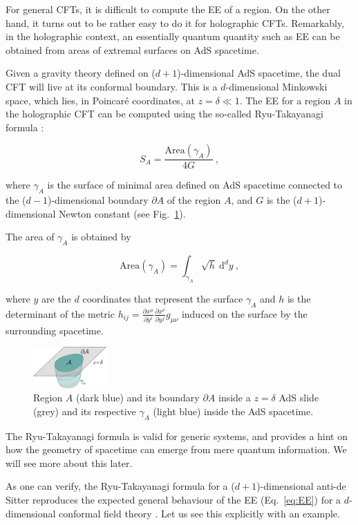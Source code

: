 \documentclass[twocolumn]{revtex4}
\providecommand{\eq}[2]{
    \begin{equation}
        #2
    \label{eq:#1}
    \end{equation}
}
\begin{document}
For general CFTs, it is difficult to compute the EE of a region. On the other hand, it turns out to be rather easy to do it for holographic CFTs. Remarkably, in the holographic context, an essentially quantum quantity such as EE can be obtained from areas of extremal surfaces on AdS spacetime.

Given a gravity theory defined on ($d+1$)-dimensional AdS spacetime, the dual CFT will live at its conformal boundary. This is a $d$-dimensional Minkowski space, which lies, in Poincar\'e coordinates, at 
$z=\delta \ll 1$. The EE for a region $A$ in the holographic CFT can be computed using the so-called Ryu-Takayanagi formula \cite{ryu_holographic_2008}:
\eq{EE_RT}{
    S_A = \frac{ \text{Area}(\gamma_A) }{ 4 G } \ ,
}
where $\gamma_A$ is the surface of minimal area defined on AdS spacetime connected to the ($d-1$)-dimensional boundary $\partial A$ of the region $A$, and $G$ is the ($d+1$)-dimensional Newton constant (see Fig.~\ref{fig:EE_AdS-CFT}).

The area of $\gamma_A$ is obtained by
\eq{EE_RT-area}{
    \text{Area}(\gamma_A) = \int_{\gamma_A} \sqrt{h} \ \mathrm{d}^{d}y \ ,
}
where $y$ are the $d$ coordinates that represent the surface $\gamma_A$ and $h$ is the determinant of the metric $h_{ij} = \frac{\partial x^\mu}{\partial y^i} \frac{\partial x^\nu}{\partial y^j} g_{\mu\nu}$ induced on the surface by the surrounding spacetime.

\begin{figure}
    \centering
    \includegraphics[width=0.25\textwidth]{../imatges/EE_AdS-CFT.png}
\caption{Region $A$ (dark blue) and its boundary $\partial A$ inside a $z=\delta$ AdS slide (grey) and its respective $\gamma_A$ (light blue) inside the AdS spacetime.}
\label{fig:EE_AdS-CFT}
\end{figure}

The Ryu-Takayanagi formula is valid for generic systems, and provides a hint on how the geometry of spacetime can emerge from mere quantum information. We will see more about this later.

As one can verify, the Ryu-Takayanagi formula for a ($d+1$)-dimensional anti-de Sitter reproduces the expected general behaviour of the EE (Eq.~\ref{eq:EE}) for a $d$-dimensional conformal field theory \cite{ryu_aspects_2006, nishioka_holographic_2009}. Let us see this explicitly with an example.
\end{document}
